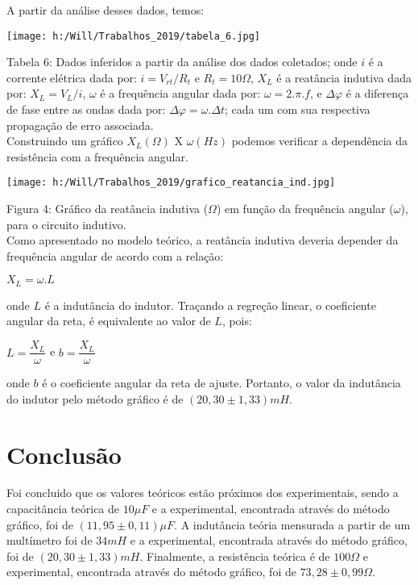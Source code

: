 \documentclass[a4paper, 12pt]{article}
\begin{document}
\begin{multicols}{2}
A partir da análise desses dados, temos:
\begin{center}
\begingroup
    \centering
    \texttt{[image: h:/Will/Trabalhos\_2019/tabela\_6.jpg]}
\endgroup
\end{center}
Tabela 6: Dados inferidos a partir da análise dos dados coletados; onde $i$ é a corrente elétrica dada por: $i=V_{rt}/R_{t}$ e $R_{t}=10\Omega$, $X_{L}$ é a reatância indutiva dada por: $X_{L}=V_{L}/i$, $\omega$ é a frequência angular dada por: $\omega=2.\pi . f$, e $\Delta \varphi$ é a diferença de fase entre as ondas dada por: $\Delta \varphi=\omega . \Delta t$; cada um com sua respectiva propagação de erro associada. \\

Construindo um gráfico $X_{L}(\Omega)$ X $\omega(Hz)$ podemos verificar a dependência da resistência com a frequência angular.
\begin{center}
\begingroup
    \centering
    \texttt{[image: h:/Will/Trabalhos\_2019/grafico\_reatancia\_ind.jpg]}
\endgroup
\end{center}
Figura 4: Gráfico da reatância indutiva ($\Omega$) em função da frequência angular ($\omega$), para o circuito indutivo. \\

Como apresentado no modelo teórico, a reatância indutiva deveria depender da frequência angular de acordo com a relação:
\begin{center}
$X_{L}=\omega .L$
\end{center} 
onde $L$ é a indutância do indutor. Traçando a regreção linear, o coeficiente angular da reta, é equivalente ao valor de $L$, pois:
\begin{center}
$L=\dfrac{X_{L}}{\omega}$ e $b=\dfrac{X_{L}}{\omega}$
\end{center} 
onde $b$ é o coeficiente angular da reta de ajuste. Portanto, o valor da indutância do indutor pelo método gráfico é de $(20,30 \pm 1,33) mH$.
\section{Conclusão}
Foi concluido que os valores teóricos estão próximos dos experimentais, sendo a capacitância teórica de $10 \mu F$ e a experimental, encontrada através do método gráfico, foi de $(11,95 \pm 0,11) \mu F$. A indutância teória mensurada a partir de um multímetro foi de $34 mH$ e a experimental, encontrada através do método gráfico, foi de $(20,30 \pm 1,33) mH$. Finalmente, a resistência teórica é de $100 \Omega$ e experimental, encontrada através do método gráfico, foi de $73,28 \pm 0,99 \Omega$. \\


\end{multicols}
\end{document}
